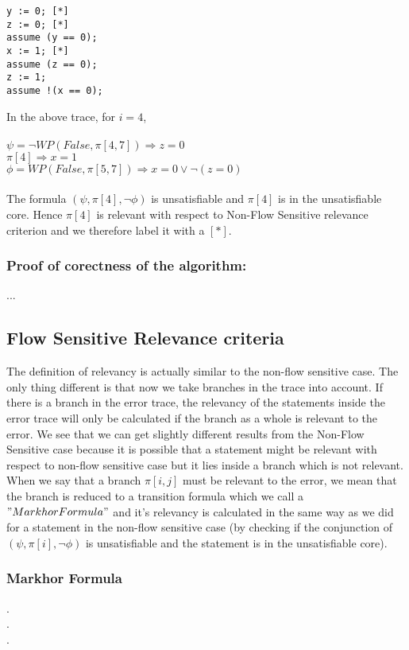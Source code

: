 \documentclass{article}
\begin{document}
\begin{lstlisting}
y := 0; [*]
z := 0; [*]
assume (y == 0);
x := 1; [*]
assume (z == 0);
z := 1;
assume !(x == 0);
\end{lstlisting}
In the above trace, for $i=4$,\\
\\
$\psi = \neg WP(False, \pi[4,7]) \Longrightarrow z=0$\\
$\pi[4] \Longrightarrow x=1$\\
$\phi =  WP(False, \pi[5,7]) \Longrightarrow x=0 \vee \neg(z=0)$\\
\\
The formula $(\psi,\pi[4],\neg \phi)$ is unsatisfiable and $\pi[4]$ is in the unsatisfiable core. Hence $\pi[4]$ is relevant with respect to Non-Flow Sensitive relevance criterion and we therefore label it with a $[*]$.
\subsubsection{Proof of corectness of the algorithm:}
...
\subsection{Flow Sensitive Relevance criteria }
The definition of relevancy is actually similar to the non-flow sensitive case. The only thing different is that now we take branches in the trace into account. If there is a branch in the error trace, the relevancy of the statements inside the error trace will only be calculated if the branch as a whole is relevant to the error. We see that we can get slightly different results from the Non-Flow Sensitive case because it is possible that a statement might be relevant with respect to non-flow sensitive case but it lies inside a branch which is not relevant. \\
When we say that a branch $\pi[i,j]$ must be relevant to the error, we mean that the branch is reduced to a transition formula which we call a $"Markhor Formula"$ and it's relevancy is calculated in the same way as we did for a statement in the non-flow sensitive case (by checking if the conjunction of $(\psi, \pi[i],\neg \phi)$ is unsatisfiable and the statement is in the unsatisfiable core).
\subsubsection{Markhor Formula}
.\\
.\\
.
\end{document}
